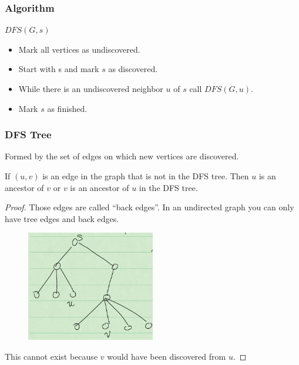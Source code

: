 \documentclass[en,hazy,blue,screen,14pt]{elegantnote}
\begin{document}
\subsubsection{Algorithm}
$DFS(G, s)$
\begin{itemize}
    \item Mark all vertices as undiscovered.
    \item Start with s and mark $s$ as discovered.
    \item While there is an undiscovered neighbor $u$ of $s$ call $DFS(G, u)$.
    \item Mark $s$ as finished.
\end{itemize}

\subsubsection{DFS Tree}
Formed by the set of edges on which new vertices are discovered. 

\begin{theorem}
If $(u, v)$ is an edge in the graph that is not in the DFS tree. Then $u$ is 
an ancestor of $v$ or $v$ is an ancestor of $u$ in the DFS tree.
\end{theorem}

\begin{proof}
Those edges are called ``back edges''. In an undirected graph you can only 
have tree edges and back edges.
\begin{figure}[H]
\centering
\includegraphics[width=0.5\textwidth]{dfs.png}
\end{figure}
This cannot exist because $v$ would have been discovered from $u$.
\end{proof}
\end{document}
